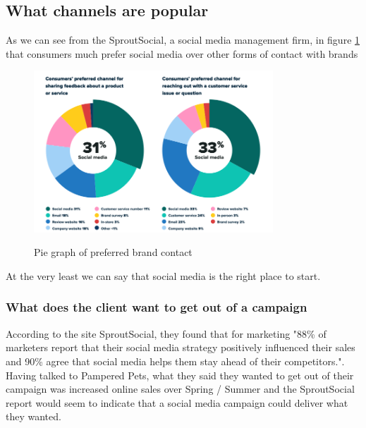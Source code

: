 \documentclass{article}
\begin{document}
\subsection{What channels are popular}
As we can see from the SproutSocial, a social media management firm, in figure \ref{fig:pie}\cite{sprout} that consumers much prefer social media over other forms of contact with brands
\FloatBarrier
\begin{figure}[ht]
    \caption{Pie graph of preferred brand contact}
    \centering
    \includegraphics[width=0.8\textwidth]{sprout-index-consumers}
    \label{fig:pie}
    \end{figure}
    \FloatBarrier

At the very least we can say that social media is the right place to start.
\subsubsection{What does the client want to get out of a campaign}
According to the site SproutSocial, they found that for marketing "88\% of marketers report that their social media strategy positively influenced their sales and 90\% agree that social media helps them stay ahead of their competitors."\cite{sprout}. Having talked to Pampered Pets, what they said they wanted to get out of their campaign was increased online sales over Spring / Summer and the SproutSocial report would seem to indicate that a social media campaign could deliver what they wanted.


\newpage
\end{document}
